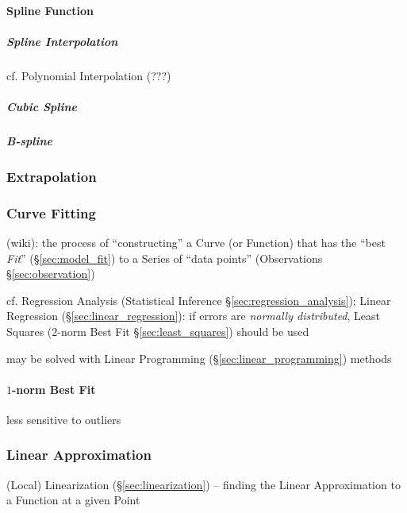 \paragraph{Spline Function}\label{sec:spline}\hfill

\subparagraph{Spline Interpolation}\label{sec:spline_interpolation}\hfill

cf. Polynomial Interpolation (???) %



\subparagraph{Cubic Spline}\label{sec:cubic_spline}\hfill

\subparagraph{B-spline}\label{sec:b_spline}\hfill



\subsubsection{Extrapolation}\label{sec:extrapolation}

\subsubsection{Curve Fitting}\label{sec:curve_fitting}

(wiki): the process of ``constructing'' a Curve (or Function) that has the
``best \emph{Fit}'' (\S\ref{sec:model_fit}) to a Series of ``data points''
(Observations \S\ref{sec:observation})

\fist cf. Regression Analysis (Statistical Inference
\S\ref{sec:regression_analysis}); Linear Regression
(\S\ref{sec:linear_regression}): if errors are \emph{normally distributed},
Least Squares ($2$-norm Best Fit \S\ref{sec:least_squares}) should be used

may be solved with Linear Programming (\S\ref{sec:linear_programming}) methods



\paragraph{$1$-norm Best Fit}\label{sec:1norm_best_fit}\hfill

less sensitive to outliers



\subsubsection{Linear Approximation}\label{sec:linear_approximation}

\fist (Local) Linearization (\S\ref{sec:linearization}) -- finding the Linear
Approximation to a Function at a given Point

